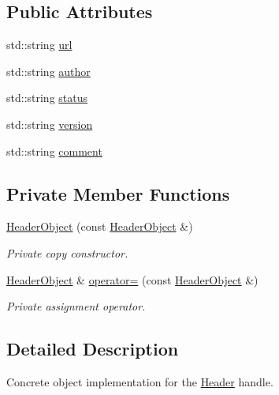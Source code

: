 \subsection*{Public Attributes}
\begin{DoxyCompactItemize}
\item 
std\+::string \hyperlink{class_d_d4hep_1_1_geometry_1_1_header_object_a702018d66501a7a062895ca2f481e697}{url}
\item 
std\+::string \hyperlink{class_d_d4hep_1_1_geometry_1_1_header_object_a63216a220333f0c791f5dc9676e9c38d}{author}
\item 
std\+::string \hyperlink{class_d_d4hep_1_1_geometry_1_1_header_object_a20972a1281cbc8afec103918e9cdae43}{status}
\item 
std\+::string \hyperlink{class_d_d4hep_1_1_geometry_1_1_header_object_a9a2b7104b14240b8b884ff0519307204}{version}
\item 
std\+::string \hyperlink{class_d_d4hep_1_1_geometry_1_1_header_object_aead0ebf0a1dcc61fbb5f30ca5113484f}{comment}
\end{DoxyCompactItemize}
\subsection*{Private Member Functions}
\begin{DoxyCompactItemize}
\item 
\hyperlink{class_d_d4hep_1_1_geometry_1_1_header_object_a335972108c4e573ae75d9f174b8acc19}{Header\+Object} (const \hyperlink{class_d_d4hep_1_1_geometry_1_1_header_object}{Header\+Object} \&)
\begin{DoxyCompactList}\small\item\em Private copy constructor. \end{DoxyCompactList}\item 
\hyperlink{class_d_d4hep_1_1_geometry_1_1_header_object}{Header\+Object} \& \hyperlink{class_d_d4hep_1_1_geometry_1_1_header_object_aa577cb624bf183b4ac62e22554f069f1}{operator=} (const \hyperlink{class_d_d4hep_1_1_geometry_1_1_header_object}{Header\+Object} \&)
\begin{DoxyCompactList}\small\item\em Private assignment operator. \end{DoxyCompactList}\end{DoxyCompactItemize}


\subsection{Detailed Description}
Concrete object implementation for the \hyperlink{class_d_d4hep_1_1_geometry_1_1_header}{Header} handle. 

